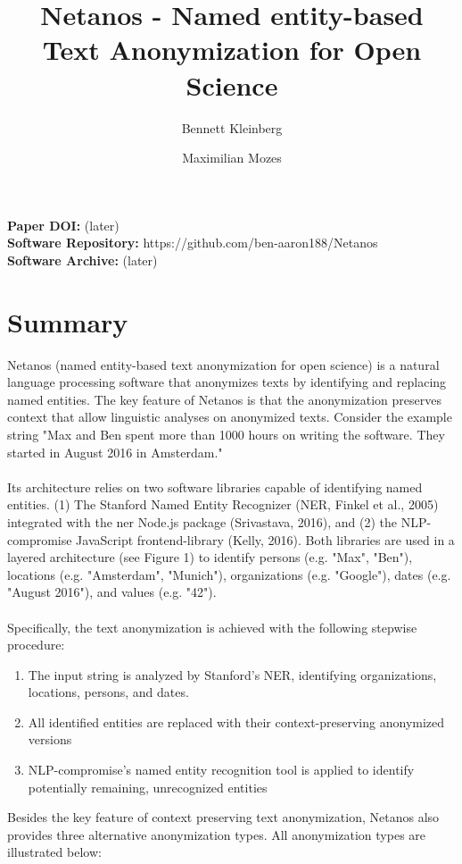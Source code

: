 \documentclass{article}
\title{\vspace{-2.0cm}Netanos -  Named entity-based Text Anonymization for Open Science
}
\author[1,$\dagger$]{Bennett Kleinberg}
\author[2,$\dagger$]{Maximilian Mozes}
\affil[1]{University of Amsterdam, The Netherlands}
\affil[2]{Technical University of Munich, Germany}
\affil[$\dagger$]{Both authors contributed equally to the development of this tool and are listed in alphabetical order.}
\begin{document}
\maketitle

\noindent \textbf{Paper DOI:} (later) \\
\textbf{Software Repository:} https://github.com/ben-aaron188/Netanos \\
\textbf{Software Archive:} (later)

\section*{Summary}
Netanos (named entity-based text anonymization for open science) is a natural language processing software that anonymizes texts by identifying and replacing named entities. The key feature of Netanos is that the anonymization preserves context that allow linguistic analyses on anonymized texts. Consider the example string "Max and Ben spent more than 1000 hours on writing the software. They started in August 2016 in Amsterdam." \\\\
\noindent Its architecture relies on two software libraries capable of identifying named entities. (1) The Stanford Named Entity Recognizer (NER, Finkel et al., 2005) integrated with the ner Node.js package (Srivastava, 2016), and (2) the NLP-compromise JavaScript frontend-library (Kelly, 2016). Both libraries are used in a layered architecture (see Figure 1) to identify persons (e.g. "Max", "Ben"), locations (e.g. "Amsterdam", "Munich"), organizations (e.g. "Google"), dates (e.g. "August 2016"), and values (e.g. "42"). \\\\
\noindent Specifically, the text anonymization is achieved with the following stepwise procedure:
\begin{enumerate} \itemsep -2pt
\item The input string is analyzed by Stanford's NER, identifying organizations, locations, persons, and dates.
\item All identified entities are replaced with their context-preserving anonymized versions
\item NLP-compromise's named entity recognition tool is applied to identify potentially remaining, unrecognized entities
\end{enumerate}
Besides the key feature of context preserving text anonymization, Netanos also provides three alternative anonymization types. All anonymization types are illustrated below:
\end{document}
